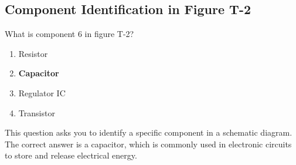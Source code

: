 \subsection{Component Identification in Figure T-2}
\label{T6C06}

\begin{tcolorbox}[colback=gray!10!white,colframe=black!75!black,title=T6C06]
What is component 6 in figure T-2?
\begin{enumerate}[noitemsep]
    \item Resistor
    \item \textbf{Capacitor}
    \item Regulator IC
    \item Transistor
\end{enumerate}
\end{tcolorbox}

This question asks you to identify a specific component in a schematic diagram. The correct answer is a capacitor, which is commonly used in electronic circuits to store and release electrical energy.